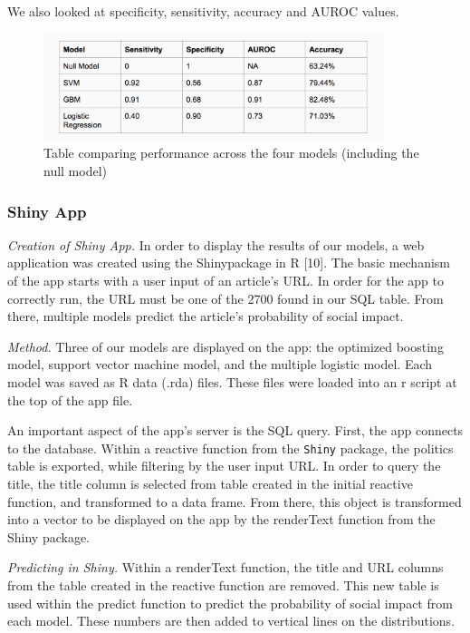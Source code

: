 \documentclass[10pt,letterpaper]{article}
\begin{document}
We also looked at specificity, sensitivity, accuracy and AUROC values.

\begin{figure}
\includegraphics[width=375px]{model-comp} \caption{Table comparing performance across the four models (including the null model)}\label{fig:unnamed-chunk-8}
\end{figure}

\hypertarget{shiny-app}{%
\subsubsection{Shiny App}\label{shiny-app}}

\emph{Creation of Shiny App.} In order to display the results of our
models, a web application was created using the Shinypackage in R
{[}10{]}. The basic mechanism of the app starts with a user input of an
article's URL. In order for the app to correctly run, the URL must be
one of the 2700 found in our SQL table. From there, multiple models
predict the article's probability of social impact.

\emph{Method.} Three of our models are displayed on the app: the
optimized boosting model, support vector machine model, and the multiple
logistic model. Each model was saved as R data (.rda) files. These files
were loaded into an r script at the top of the app file.

An important aspect of the app's server is the SQL query. First, the app
connects to the database. Within a reactive function from the
\texttt{Shiny} package, the politics table is exported, while filtering
by the user input URL. In order to query the title, the title column is
selected from table created in the initial reactive function, and
transformed to a data frame. From there, this object is transformed into
a vector to be displayed on the app by the renderText function from the
Shiny package.

\emph{Predicting in Shiny.} Within a renderText function, the title and
URL columns from the table created in the reactive function are removed.
This new table is used within the predict function to predict the
probability of social impact from each model. These numbers are then
added to vertical lines on the distributions.
\end{document}
